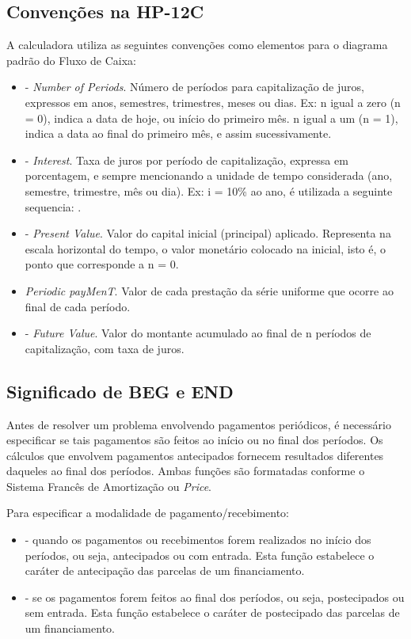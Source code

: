 \subsection*{Convenções na HP-12C}
A calculadora utiliza as seguintes convenções como elementos para o diagrama padrão do Fluxo de Caixa: \vspace{-1em}
\begin{itemize}
	\item {} - \textit{Number of Periods}. Número de períodos para capitalização de juros, expressos em anos, semestres, trimestres, meses ou dias. Ex: n igual a zero (n = 0), indica a data de hoje, ou início do primeiro mês. n igual a um (n = 1), indica a data ao final do primeiro mês, e assim sucessivamente.
	\item {} - \textit{Interest}. Taxa de juros por período de capitalização, expressa em porcentagem, e sempre mencionando a unidade de tempo considerada (ano, semestre, trimestre, mês ou dia). Ex: i = 10\% ao ano, é utilizada a seguinte sequencia:   .
	\item {} - \textit{Present Value}. Valor do capital inicial (principal) aplicado. Representa na escala horizontal do tempo, o valor monetário colocado na inicial, isto é, o ponto que corresponde a n = 0.
	\item {} \textit{Periodic payMenT}. Valor de cada prestação da série uniforme que ocorre ao final de cada período.
	\item {} - \textit{Future Value}. Valor do montante acumulado ao final de n períodos de capitalização, com taxa de juros.
\end{itemize}	

\subsection*{Significado de BEG e END}
Antes de resolver um problema envolvendo pagamentos periódicos, é necessário especificar se tais pagamentos são feitos ao início ou no final dos períodos. Os cálculos que envolvem pagamentos antecipados fornecem resultados diferentes daqueles ao final dos períodos. Ambas funções são formatadas conforme o Sistema Francês de Amortização ou \textit{Price}.

Para especificar a modalidade de pagamento/recebimento:\vspace{-1em}
\begin{itemize}
	\item {}  - quando os pagamentos ou recebimentos forem realizados no início dos períodos, ou seja, antecipados ou com entrada. Esta função estabelece o caráter de antecipação das parcelas de um financiamento.
	\item {}  - se os pagamentos forem feitos ao final dos períodos, ou seja, postecipados ou sem entrada. Esta função estabelece o caráter de postecipado das parcelas de um financiamento.
\end{itemize}	

